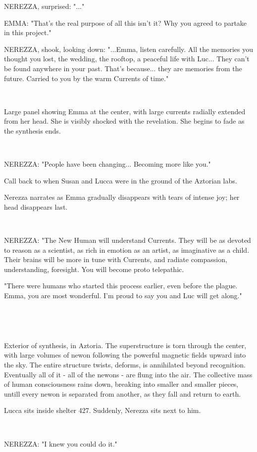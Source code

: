 \documentclass[11pt]{article}
\begin{document}
NEREZZA, surprised: "..."

EMMA: "That's the real purpose of all this isn't it?
Why you agreed to partake in this project."

NEREZZA, shook, looking down: "...Emma, listen carefully.
All the memories you thought you lost, the wedding, the rooftop, a peaceful life with Luc... They can't be found anywhere in your past. 
That's because... they are memories from the future.
Carried to you by the warm Currents of time."

\ 

Large panel showing Emma at the center, with large currents radially extended from her head.
She is visibly shocked with the revelation.
She begins to fade as the synthesis ends. 

\ 

NEREZZA: "People have been changing...
Becoming more like you."

Call back to when Susan and Lucca were in the ground of the Aztorian labs.

Nerezza narrates as Emma gradually disappears with tears of intense joy; her head disappears last.

\ 

NEREZZA: "The New Human will understand Currents. 
They will be as devoted to reason as a scientist, as rich in emotion as an artist, as imaginative as a child.
Their brains will be more in tune with Currents, and radiate compassion, understanding, foresight.
You will become proto telepathic.

"There were humans who started this process earlier, even before the plague.
Emma, you are most wonderful.
I'm proud to say you and Luc will get along."

\ 

\ 

Exterior of synthesis, in Aztoria.
The superstructure is torn through the center, with large volumes of newon following the powerful magnetic fields upward into the sky. 
The entire structure twists, deforms, is annihilated beyond recognition.
Eventually all of it - all of the newons - are flung into the air.
The collective mass of human consciousness rains down, breaking into smaller and smaller pieces, untill every newon is separated from another, as they fall and return to earth. 

Lucca sits inside shelter 427. 
Suddenly, Nerezza sits next to him.

\ 

NEREZZA: "I knew you could do it."
\end{document}
